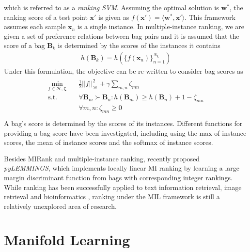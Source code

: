 \noindent
which is referred to as a \textit{ranking SVM}.  Assuming the optimal solution is $\bm{w}^{*}$, the ranking score of a test point $\bm{x}'$ is given as $f(\bm{x}') = \langle \bm{w}^{*}, \bm{x}' \rangle$.  This framework assumes each sample $\bm{x}_{n}$ is a single instance.  In multiple-instance ranking, we are given a set of preference relations between bag pairs and it is assumed that the score of a bag $\bm{B}_{k}$ is determined by the scores of the instances it contains
\begin{align}
	h(\bm{B}_{k}) = h \left( \{ f(\bm{x}_{n})\}_{n=1}^{N_{k}} \right)
\end{align}
\noindent
Under this formulation, the objective can be re-written to consider bag scores as
\begin{align}
\begin{split}
\min_{f\in\mathcal{H},\bm{\zeta}} \quad &\frac{1}{2} ||f ||^{2}_{\mathcal{H}} + \gamma \sum_{m,n} \zeta_{mn} \\
\text{s.t.} \quad &\forall \bm{B}_m \succ \bm{B}_n: h(\bm{B}_{m}) \geq h(\bm{B}_{n}) + 1 -\zeta_{mn}\\
&\forall m,n: \zeta_{mn} \geq 0\\
\end{split}
\end{align}
\noindent
A bag's score is determined by the scores of its instances.  Different functions for providing a bag score have been investigated, including using the max of instance scores, the mean of  instance scores and the softmax of instance scores.

Besides MIRank and multiple-instance ranking, \cite{Asif2017LargeMarginMIRanking} recently proposed \textit{pyLEMMINGS}, which implements locally linear MI ranking by learning a large margin discriminant function from bags with corresponding integer rankings.  While ranking has been successfully applied to text information retrieval, image retrieval \citep{Hu2008MIRanking} and bioinformatics \citep{Asif2017LargeMarginMIRanking}, ranking under the MIL framework is still a relatively unexplored area of research.
\section{Manifold Learning} \label{sec:Manifold_Learning}

